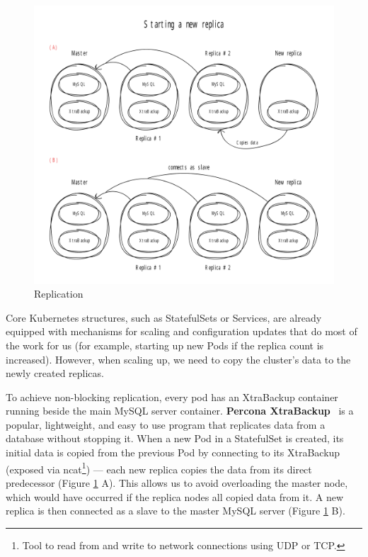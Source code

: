 \begin{figure}[!ht]
    \centering
    \includegraphics[width=1\textwidth, angle=0]{img/replication.pdf}
    \caption{Replication}
    \label{fig:replication}
\end{figure}

Core Kubernetes structures, such as StatefulSets or Services, are already equipped with mechanisms
for scaling and configuration updates that do most of the work for us (for example, starting up new
Pods if the replica count is increased). However, when scaling up, we need to copy the cluster’s
data to the newly created replicas.

To achieve non-blocking replication, every pod has an XtraBackup
container running beside the main MySQL server container.  \textbf{Percona XtraBackup}~\cite{percona}
is a popular, lightweight, and easy to use program that replicates data from a database without
stopping it. When a new Pod in a StatefulSet is created, its initial data is copied from the
previous Pod by connecting to its XtraBackup (exposed via ncat\footnote{Tool to read from and
write to network connections using UDP or TCP.}) --- each new replica copies the data from its direct
predecessor (Figure \ref{fig:replication} A). This allows us to avoid overloading the master node,
which would have occurred if the replica nodes all copied data from it. A new replica is then connected
as a slave to the master MySQL server (Figure \ref{fig:replication} B).

